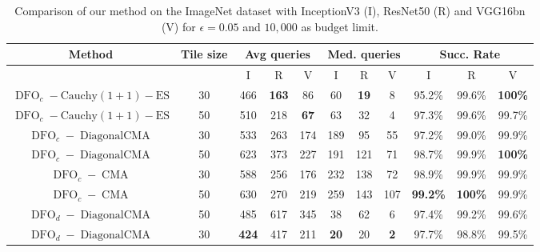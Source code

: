 \begin{scriptsize}
\begin{table}[htb]
\caption{Comparison of our method on the ImageNet dataset with InceptionV3 (I), ResNet50 (R) and VGG16bn (V) for $\epsilon=0.05$ and $10,000$ as budget limit.}
\label{untargeted_archi}
\begin{center}
\begin{tabular}{cc|ccc|ccc|ccc}
\textbf{Method} &\textbf{Tile size}&\multicolumn{3}{c|}{\textbf{Avg queries}}&\multicolumn{3}{c|}{\textbf{Med. queries}}&\multicolumn{3}{c}{\textbf{Succ. Rate}}\\
\hline
 & & I & R & V &  I & R & V&  I & R & V\\
 \hline
$\operatorname{DFO}_c-\operatorname{Cauchy (1+1)-ES }$ &30 & 466&\textbf{163}&86 & 60&\textbf{19}&8 & 95.2\%&99.6\%&\textbf{100\% }\\

$\operatorname{DFO}_c-\operatorname{Cauchy (1+1)-ES }$ & 50 & 510&218&\textbf{67}& 63&32&4& 97.3\% &99.6\%&99.7\%\\
\hline
$\operatorname{DFO}_c-\operatorname{DiagonalCMA}$& 30 &533&263&174& 189&95&55 & 97.2\%&99.0\%&99.9\%\\
$\operatorname{DFO}_c-\operatorname{DiagonalCMA}$ & 50 & 623&373&227& 191&121&71 & 98.7\%&99.9\%&\textbf{100\%}\\

\hline
$\operatorname{DFO}_c-\operatorname{CMA}$& 30 &588&256&176& 232&138&72& 98.9\%&99.9\%&99.9\%\\
$\operatorname{DFO}_c-\operatorname{CMA}$ & 50 & 630&270&219& 259&143&107 & \textbf{99.2\%}&\textbf{100\%}&99.9\%\\

\hline
$\operatorname{DFO}_d-\operatorname{DiagonalCMA}$& 50 & 485&617&345& 38& 62&6& 97.4\%&99.2\%&99.6\%\\
$\operatorname{DFO}_d-\operatorname{DiagonalCMA}$ & 30 & \textbf{424}&417&211& \textbf{20}&20&\textbf{2}& 97.7\%&98.8\%&99.5\%\\
\end{tabular}
\end{center}
\end{table}
\end{scriptsize}



\newpage


